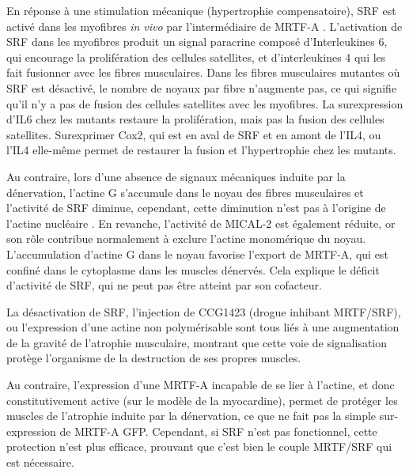 En réponse à une stimulation mécanique (hypertrophie compensatoire), SRF est activé dans les myofibres \textit{in vivo} par l'intermédiaire de MRTF-A  \cite{guerci_srf-dependent_2012}. 
L'activation de SRF dans les myofibres produit un signal paracrine composé d'Interleukines 6, qui encourage la prolifération des cellules satellites, et d'interleukines 4 qui les fait fusionner avec les fibres musculaires. 
Dans les fibres musculaires mutantes où SRF est désactivé, le nombre de noyaux par fibre n'augmente pas, ce qui signifie qu'il n'y a pas de fusion des cellules satellites avec les myofibres. La surexpression d'IL6 chez les mutants restaure la prolifération, mais pas la fusion des cellules satellites. Surexprimer Cox2, qui est en aval de SRF et en amont de l'IL4, ou l'IL4 elle-même permet de restaurer la fusion et l'hypertrophie chez les mutants. 


Au contraire, lors d'une absence de signaux mécaniques induite par la dénervation, l'actine G s'accumule dans le noyau des fibres musculaires et l'activité de SRF diminue, cependant, cette diminution n'est pas à l'origine de l'actine nucléaire \cite{collard_nuclear_2014}. En revanche, l'activité de MICAL-2 est également réduite, or son rôle contribue normalement à exclure l'actine monomérique du noyau. 
L'accumulation d'actine G dans le noyau favorise l'export de MRTF-A, qui est confiné dans le cytoplasme dans les muscles dénervés. Cela explique le déficit d'activité de SRF, qui ne peut pas être atteint par son cofacteur. 

La désactivation de SRF, l'injection de CCG1423 (drogue inhibant MRTF/SRF), ou l'expression d'une actine non polymérisable sont tous liés à une augmentation de la gravité de l'atrophie musculaire, montrant que cette voie de signalisation protège l'organisme de la destruction de ses propres muscles. 

Au contraire, l'expression d'une MRTF-A incapable de se lier à l'actine, et donc constitutivement active (sur le modèle de la myocardine), permet de protéger les muscles de l'atrophie induite par la dénervation, ce que ne fait pas la simple sur-expression de MRTF-A GFP. Cependant, si SRF n'est pas fonctionnel, cette protection n'est plus efficace, prouvant que c'est bien le couple MRTF/SRF qui est nécessaire. 


%